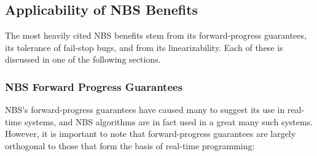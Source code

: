 \QuickQuizEnd

\subsection{Applicability of NBS Benefits}
\label{sec:advsync:Applicability of NBS Benefits}

The most heavily cited NBS benefits stem from its forward-progress
guarantees, its tolerance of fail-stop bugs, and from its linearizability.
Each of these is discussed in one of the following sections.

\subsubsection{NBS Forward Progress Guarantees}
\label{sec:advsync:NBS Forward Progress Guarantees}

NBS's forward-progress guarantees have caused many to suggest its use in
real-time systems, and NBS algorithms are in fact used in a great many
such systems.
However, it is important to note that forward-progress guarantees are
largely orthogonal to those that form the basis of real-time programming:

